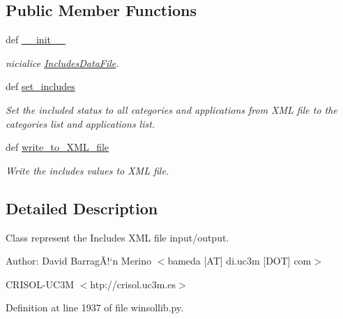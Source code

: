 \subsection*{Public Member Functions}
\begin{CompactItemize}
\item 
def \hyperlink{classwinsollib_1_1IncludesDataFile_64deea7da911c3fb099dee54eb1f6cf9}{\_\-\_\-init\_\-\_\-}
\begin{CompactList}\small\item\em nicialice \hyperlink{classwinsollib_1_1IncludesDataFile}{Includes\-Data\-File}. \item\end{CompactList}\item 
def \hyperlink{classwinsollib_1_1IncludesDataFile_f3fc71443476782ede889658ad70ef1f}{set\_\-includes}
\begin{CompactList}\small\item\em Set the included status to all categories and applications from XML file to the categories list and applications list. \item\end{CompactList}\item 
def \hyperlink{classwinsollib_1_1IncludesDataFile_c00968b80f4b283abebe905f267f07b5}{write\_\-to\_\-XML\_\-file}
\begin{CompactList}\small\item\em Write the includes values to XML file. \item\end{CompactList}\end{CompactItemize}


\subsection{Detailed Description}
Class represent the Includes XML file input/output. 

\begin{Desc}
\item[Author:]David Barrag\~{A}!`n Merino $<$bameda \mbox{[}AT\mbox{]} di.uc3m \mbox{[}DOT\mbox{]} com$>$ 

CRISOL-UC3M $<$htp://crisol.uc3m.es$>$ \end{Desc}




Definition at line 1937 of file winsollib.py.

